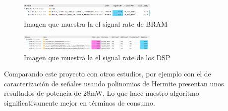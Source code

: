 	\begin{figure}[h!]
		\centering
		\includegraphics[width=0.6\textwidth]{./Images/img_res_experimentales/signalrateBRAM.png}
		\caption{Imagen que muestra la el signal rate de BRAM}
		\label{fig:signalrateBRAM}
	\end{figure} 

	\begin{figure}[h!]
		\centering
		\includegraphics[width=0.6\textwidth]{./Images/img_res_experimentales/signalrateDSP.png}
		\caption{Imagen que muestra la el signal rate de los DSP}
		\label{fig:signalrateDSP}
	\end{figure} 

	Comparando este proyecto con otros estudios, por ejemplo con el de caracterización de señales usando polinomios de Hermite \cite{desai2021low} presentan unos resultados de potencia de 28mW. Lo que hace nuestro algoritmo significativamente mejor en términos de consumo.








	